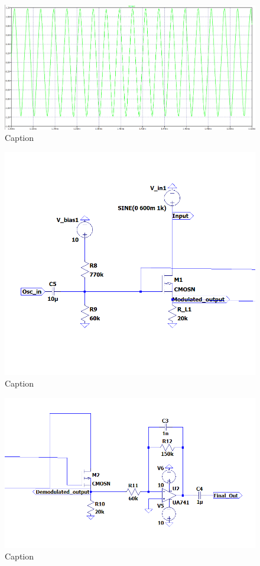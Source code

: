 \documentclass[conference]{IEEEtran}
\begin{document}
\begin{figure}
    \centering
    \includegraphics[width=1\linewidth]{Images/Osc_simulation.png}
    \caption{Caption}
\end{figure}

\begin{figure}
    \centering
    \includegraphics[width=1\linewidth]{Images/Modulator_ltspice.png}
    \caption{Caption}
\end{figure}

\begin{figure}
    \centering
    \includegraphics[width=1\linewidth]{Images/Demodulator_ltspice.png}
    \caption{Caption}
\end{figure}
\end{document}
